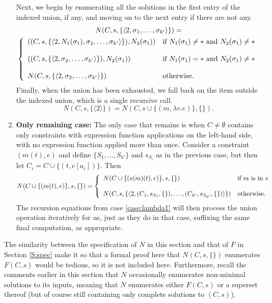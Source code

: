 \documentclass{article}
\begin{document}
\begin{enumerate}
		Next, we begin by enumerating all the solutions in the first entry of the indexed union, if any, and moving on to the next entry if there are not any.
		\begin{multline*}
			N(C,s,\{\langle2,\sigma_1,\ldots,\sigma_{k'}\rangle\}) = \\ \left\{\begin{array}{l l}
				((C,s,\{\langle2,N_1(\sigma_1),\sigma_2,\ldots,\sigma_{k'}\rangle\}),N_2(\sigma_1)) & \text{if $N_1(\sigma_1)\neq*$ and $N_2(\sigma_1)\neq*$} \\
				& \\
				((C,s,\{\langle2,\sigma_2,\ldots,\sigma_{k'}\rangle\}),N_2(\sigma_1)) & \text{if $N_1(\sigma_1)=*$ and $N_2(\sigma_1)\neq*$} \\
				& \\
				N(C,s,\{\langle2,\sigma_2,\ldots,\sigma_{k'}\rangle\}) & \text{otherwise.}
			\end{array}\right.
		\end{multline*}
		Finally, when the union has been exhausted, we fall back on the item outside the indexed union, which is a single recursive call.
		$$
			N(C,s,\{\langle2\rangle\}) = N(C,s\cup\{(m,\lambda v.e)\},\{\}).
		$$
\item	{\bf Only remaining case:}
		The only case that remains is when $C\neq\emptyset$ contains only constraints with expression function applications on the left-hand side, with no expression function applied more than once.  Consider a constraint $(m(t),e)$ and define $\{S_1,\ldots,S_{k'}\}$ and $s_{S_i}$ as in the previous case, but then let $C_i=C\cup\{(t,e[a_i])\}$.  Then
		$$
			N(C\cup\{(m(t),e)\},s,\{\})=\left\{\begin{array}{l l}
				N(C\cup\{(s(m)(t),e)\},s,\{\})	&	\text{if $m$ is in $s$} \\
				& \\
				N(C,s,\{\langle2,(C_1,s_{S_1},\{\}),\ldots,(C_{k'},s_{S_{k'}},\{\})\rangle\})	&	\text{otherwise.}
			\end{array}\right.
		$$
		The recursion equations from case \ref{case:lambda1} will then process the union operation iteratively for us, just as they do in that case, suffixing the same final computation, as appropriate.
\end{enumerate}

The similarity between the specification of $N$ in this section and that of $F$ in Section \ref{S:spec} make it so that a formal proof here that $N(C,s,\{\})$ enumerates $F(C,s)$ would be tedious, so it is not included here.  Furthermore, recall the comments earlier in this section that $N$ occasionally enumerates non-minimal solutions to its inputs, meaning that $N$ enumerates either $F(C,s)$ or a superset thereof (but of course still containing only complete solutions to $(C,s)$).
\end{document}
